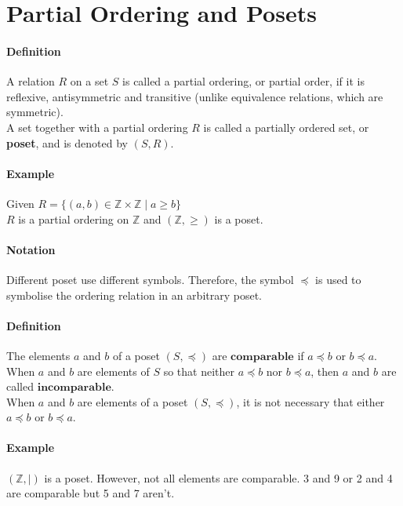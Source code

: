 \documentclass[10pt,a4paper]{book}
\begin{document}
\section{Partial Ordering and Posets}
\paragraph*{Definition}
A relation $R$ on a set $S$ is called a partial ordering, or partial order, if it is reflexive, antisymmetric and transitive (unlike equivalence relations, which are symmetric).\\
A set together with a partial ordering $R$ is called a partially ordered set, or \textbf{poset}, and is denoted by $(S,R)$.
\paragraph*{Example}
Given $R = \{(a,b) \in \mathbb{Z} \times \mathbb{Z} \mid a \geqslant b \}$\\
$R$ is a partial ordering on $\mathbb{Z}$ and $(\mathbb{Z}, \geqslant)$ is a poset.
\paragraph*{Notation}
Different poset use different symbols. Therefore, the symbol $\preceq$ is used to symbolise the ordering relation in an arbitrary poset.
\paragraph*{Definition}
The elements $a$ and $b$ of a poset $(S,\preceq)$ are $\mathbf{comparable}$ if $a \preceq b$ or $b \preceq a$.\\
When $a$ and $b$ are elements of $S$ so that neither $a \preceq b$ nor $b \preceq a$, then $a$ and $b$ are called $\mathbf{incomparable}$.\\
When $a$ and $b$ are elements of a poset $(S,\preceq)$, it is not necessary that either $a \preceq b$ or $b \preceq a$.
\paragraph*{Example}
$(\mathbb{Z},|)$ is a poset. However, not all elements are comparable. 3 and 9 or 2 and 4 are comparable but 5 and 7 aren't.
\end{document}
